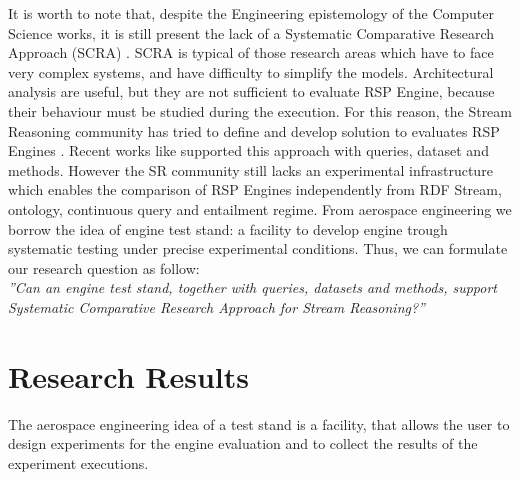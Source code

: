 It is worth to note that, despite the Engineering epistemology of the Computer Science works, it is still present the lack of a Systematic Comparative Research Approach (SCRA) \cite{Tichy:1995:EEC:209090.209093}. SCRA is typical of those research areas which have to face very complex systems, and have difficulty to simplify the models. Architectural analysis are useful, but they are not sufficient to evaluate RSP Engine, because their behaviour must be studied during the execution. For this reason, the Stream Reasoning community has tried to define and develop solution to evaluates RSP Engines \cite{DBLP:conf/esws/ScharrenbachUMVB13}. Recent works like \cite{Zhang2012, LePhuoc2012c, DBLP:conf/semweb/DellAglioCBCV13} supported this approach with queries, dataset and methods. However the SR community still lacks an experimental infrastructure which enables the comparison of RSP Engines independently from RDF Stream, ontology, continuous query and entailment regime.  From aerospace engineering we borrow the idea of engine test stand: a facility to develop engine trough systematic testing under precise experimental conditions. Thus, we can formulate our research question as follow:\\

\textit{”Can an engine test stand, together with queries, datasets and methods, support Systematic Comparative Research Approach for Stream Reasoning?”}

\section{Research Results}\label{sec:research-results-conclusion}


The aerospace engineering idea of a test stand is a facility, that allows the user to design experiments for the engine evaluation and to collect the results of the experiment executions. 

